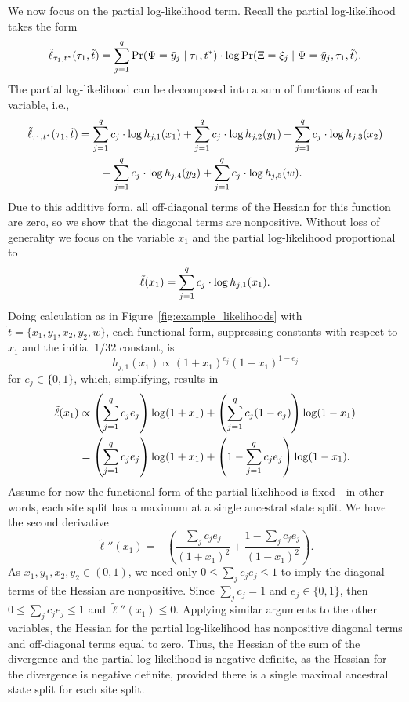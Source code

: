 We now focus on the partial log-likelihood term.
Recall the partial log-likelihood takes the form
\[
\tilde{\ell}_{\tau_1,t^*}(\tau_1, \tilde{t}) = \sum_{j=1}^q \Pr(\Psi=\tilde{y}_j \mid \tau_1, t^*)\cdot\log \Pr(\Xi=\xi_j \mid \Psi = \tilde{y}_j, \tau_1, \tilde{t}).
\]
The partial log-likelihood can be decomposed into a sum of functions of each variable, i.e.,
\begin{align*}
\tilde{\ell}_{\tau_1,t^*}(\tau_1, \tilde{t}) &= \sum_{j=1}^q c_j\cdot\log h_{j,1}(x_1)+\sum_{j=1}^q c_j\cdot\log h_{j,2}(y_1)+\sum_{j=1}^q c_j\cdot\log h_{j,3}(x_2)\\
&\qquad +\sum_{j=1}^q c_j\cdot\log h_{j,4}(y_2)+\sum_{j=1}^q c_j\cdot\log h_{j,5}(w).
\end{align*}
Due to this additive form, all off-diagonal terms of the Hessian for this function are zero, so we show that the diagonal terms are nonpositive.
Without loss of generality we focus on the variable $x_1$ and the partial log-likelihood proportional to
\[
\tilde{\ell}(x_1) = \sum_{j=1}^q c_j\cdot\log h_{j,1}(x_1).
\]
Doing calculation as in Figure~\ref{fig:example_likelihoods} with $\tilde{t}=\{x_1,y_1,x_2,y_2,w\}$, each functional form, suppressing constants with respect to $x_1$ and the initial $1/32$ constant, is
\[
h_{j,1}(x_1) \propto (1+x_1)^{e_j}(1-x_1)^{1-e_j}
\]
for $e_j\in\{0,1\}$, which, simplifying, results in
\begin{align}
\tilde{\ell}(x_1) &\propto \left(\sum_{j=1}^q c_je_j\right) \log(1+x_1) + \left(\sum_{j=1}^q c_j(1-e_j)\right) \log (1-x_1)\\
                  &= \left(\sum_{j=1}^q c_je_j\right) \log(1+x_1) + \left(1-\sum_{j=1}^q c_je_j\right) \log (1-x_1).
\end{align}
Assume for now the functional form of the partial likelihood is fixed---in other words, each site split has a maximum at a single ancestral state split.
We have the second derivative
\[
\tilde{\ell}''(x_1) = -\left(\frac{\sum_j c_je_j}{(1+x_1)^2}+\frac{1-\sum_j c_je_j}{(1-x_1)^2}\right).
\]
As $x_1,y_1,x_2,y_2\in(0,1)$, we need only $0 \le \sum_j c_je_j \le 1$ to imply the diagonal terms of the Hessian are nonpositive.
Since $\sum_j c_j = 1$ and $e_j\in\{0,1\}$, then $0 \le \sum_j c_je_j \le 1$ and $\tilde{\ell}''(x_1) \le 0$.
Applying similar arguments to the other variables, the Hessian for the partial log-likelihood has nonpositive diagonal terms and off-diagonal terms equal to zero.
Thus, the Hessian of the sum of the divergence and the partial log-likelihood is negative definite, as the Hessian for the divergence is negative definite, provided there is a single maximal ancestral state split for each site split.

